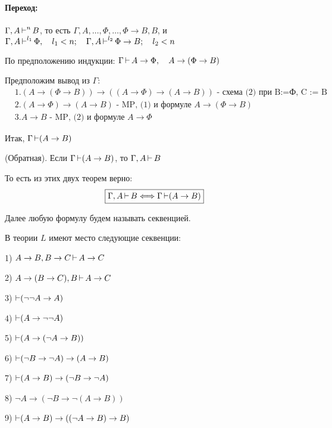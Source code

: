 \begin{myproof}
\paragraph*{Переход:} $\Gamma,A\operatorname{\vdash}^{n}B$, то есть $\Gamma,A,\ldots,\Phi,\ldots,\Phi \to B, B$, и
$\Gamma,A \operatorname{\vdash}^{l_1}\Phi, \quad l_1 < n; \quad \Gamma,A \operatorname{\vdash}^{l_2}\Phi\to B; \quad l_2 < n$

По предположению индукции: $\Gamma \operatorname{\vdash} A\to \Phi, \quad A \to (\Phi \to B)$

Предположим вывод из $\Gamma:$
 \begin{align*}
    &1. (A \to (\Phi\to B)) \to ((A \to \Phi) \to (A \to B)) \text{ - схема (2) при B:=Ф, C := B}\\
    &2. (A \to \Phi) \to (A \to B) \text{ - MP, (1) и формуле $A \to (\Phi \to B)$ }\\
    &3. A \to B \text{ - MP, (2) и формуле $A \to \Phi$ }
\end{align*}

Итак, $\Gamma \operatorname{\vdash} (A \to B)$

\end{myproof}

\begin{theorem}
    (Обратная). Если $\Gamma \operatorname{\vdash}(A\to B)$, то $\Gamma,A\operatorname{\vdash} B$
\end{theorem}

То есть из этих двух теорем верно:
\[
    \boxed{
        \Gamma,A \operatorname{\vdash} B \Longleftrightarrow \Gamma \operatorname{\vdash} (A\to B )
    }
\] 

\medskip

Далее любую формулу будем называть секвенцией.

\medskip

\begin{theorem}
В теории $L$ имеют место следующие секвенции:

1)  $A \to B, B \to C \operatorname{\vdash} A \to C$

2) $A \to (B \to C), B \operatorname{\vdash} A \to C$

3) $\operatorname{\vdash} (\lnot\lnot A \to A)$

4) $\operatorname{\vdash} (A \to \lnot\lnot A)$ 

5) $\operatorname{\vdash} (A \to (\lnot A\to B))$

6) $\operatorname{\vdash} (\lnot B \to \lnot A) \to (A \to B)$

7) $\operatorname{\vdash} (A \to B) \to (\lnot B \to \lnot A)$

8) $\lnot A \to (\lnot B \to \lnot(A \to B))$

9) $\operatorname{\vdash} (A \to B) \to ((\lnot A \to B) \to B)$
\end{theorem}

